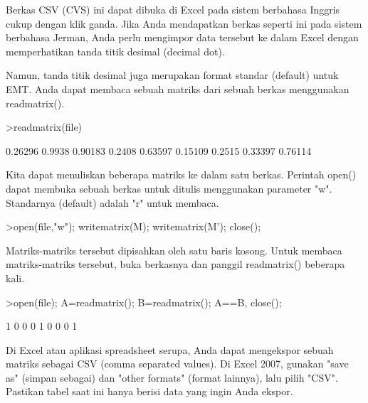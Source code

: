 \documentclass{article}
\newenvironment{eulernotebook}{\par}{\par}
\newenvironment{eulercomment}{\par\medskip}{\par\medskip}
\begin{document}
\begin{eulernotebook}
\begin{eulercomment}
\begin{eulercomment}
\begin{eulercomment}
\begin{eulercomment}
\begin{eulercomment}
\begin{eulercomment}
\begin{euleroutput}
\end{euleroutput}
\begin{eulercomment}
Berkas CSV (CVS) ini dapat dibuka di Excel pada sistem berbahasa
Inggris cukup dengan klik ganda. Jika Anda mendapatkan berkas seperti
ini pada sistem berbahasa Jerman, Anda perlu mengimpor data tersebut
ke dalam Excel dengan memperhatikan tanda titik desimal (decimal dot).

Namun, tanda titik desimal juga merupakan format standar (default)
untuk EMT. Anda dapat membaca sebuah matriks dari sebuah berkas
menggunakan readmatrix().
\end{eulercomment}
\begin{eulerprompt}
>readmatrix(file)
\end{eulerprompt}
\begin{euleroutput}
    0.26296    0.9938   0.90183 
     0.2408   0.63597   0.15109 
     0.2515   0.33397   0.76114 
\end{euleroutput}
\begin{eulercomment}
Kita dapat menuliskan beberapa matriks ke dalam satu berkas. Perintah
open() dapat membuka sebuah berkas untuk ditulis menggunakan parameter
"w". Standarnya (default) adalah "r" untuk membaca.
\end{eulercomment}
\begin{eulerprompt}
>open(file,"w"); writematrix(M); writematrix(M'); close();
\end{eulerprompt}
\begin{eulercomment}
Matriks-matriks tersebut dipisahkan oleh satu baris kosong. Untuk
membaca matriks-matriks tersebut, buka berkasnya dan panggil
readmatrix() beberapa kali.
\end{eulercomment}
\begin{eulerprompt}
>open(file); A=readmatrix(); B=readmatrix(); A==B, close();
\end{eulerprompt}
\begin{euleroutput}
          1         0         0 
          0         1         0 
          0         0         1 
\end{euleroutput}
\begin{eulercomment}
Di Excel atau aplikasi spreadsheet serupa, Anda dapat mengekspor
sebuah matriks sebagai CSV (comma separated values). Di Excel 2007,
gunakan "save as" (simpan sebagai) dan "other formats" (format
lainnya), lalu pilih "CSV". Pastikan tabel saat ini hanya berisi data
yang ingin Anda ekspor.


\end{eulercomment}
\end{eulercomment}
\end{eulercomment}
\end{eulercomment}
\end{eulercomment}
\end{eulercomment}
\end{eulercomment}
\end{eulernotebook}
\end{document}

